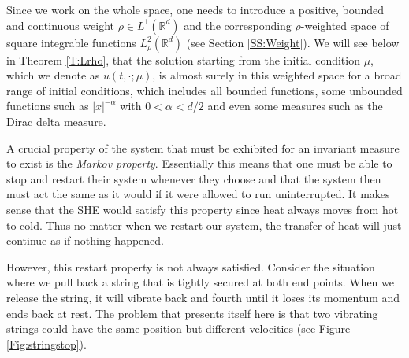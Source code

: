 \documentclass[12pt]{report}
\theoremstyle{plain}
\theoremstyle{definition}
\numberwithin{equation}{section}
\newcommand{\R}{\mathbb{R}}
\begin{document}
Since we work on the whole space, one needs to introduce a positive, bounded and continuous weight $\rho \in L^1(\R^d)$ and the corresponding $\rho$-weighted space of square integrable functions $L^2_{\rho}(\R^d)$ (see Section \ref{SS:Weight}). We will see below in Theorem \ref{T:Lrho}, that the solution starting from the initial condition $\mu$, which we denote as $u(t,\cdot; \mu)$, is almost surely in this weighted space for a broad range of initial conditions, which includes all bounded functions, some unbounded functions such as $|x|^{-\alpha}$ with $0 < \alpha < d/2$ and even some measures such as the Dirac delta measure.

A crucial property of the system that must be exhibited for an invariant measure to exist is the {\em Markov property}. Essentially this means that one must be able to stop and restart their system whenever they choose and that the system then must act the same as it would if it were allowed to run uninterrupted. It makes sense that the SHE would satisfy this property since heat always moves from hot to cold. Thus no matter when we restart our system, the transfer of heat will just continue as if nothing happened. 

However, this restart property is not always satisfied. Consider the situation where we pull back a string that is tightly secured at both end points. When we release the string, it will vibrate back and fourth until it loses its momentum and ends back at rest. The problem that presents itself here is that two vibrating strings could have the same position but different velocities (see Figure \ref{Fig:stringstop}). 
\end{document}
